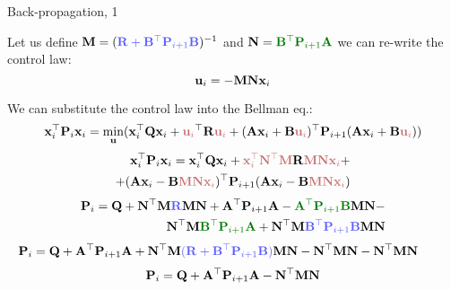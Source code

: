 \documentclass{beamer}
\begin{document}
\begin{frame}{Back-propagation, 1}
	\begin{flushleft}
		
		Let us define $\bo{M} = (\textcolor{myblue}{\bo{R} + \bo{B}\T \bo{P}_{i+1} \bo{B}})^{-1}$ and $\bo{N} =\textcolor{mydarkgreen}{\bo{B}\T \bo{P}_{i+1} \bo{A}}$ we can re-write the control law:
		\begin{equation}
			\mathbf{u}_i = -\mathbf{M} \mathbf{N} \mathbf{x}_i
		\end{equation}
		
		We can substitute the control law into the Bellman eq.:
		\begin{equation*}
			\bo{x}_i\T \bo{P}_i \bo{x}_i
			= \underset{\bo{u}}{\text{min}} 
			(\bo{x}_i\T \bo{Q} \bo{x}_i +  \textcolor{myred}{\bo{u}_i}\T \bo{R} \textcolor{myred}{\bo{u}_i}  + 
			(\bo{A}\bo{x}_i + \bo{B}\textcolor{myred}{\bo{u}_i})\T \bo{P}_{i+1} (\bo{A}\bo{x}_i + \bo{B}\textcolor{myred}{\bo{u}_i}) 
			)
		\end{equation*}
		\begin{align*}
		\bo{x}_i\T \bo{P}_i \bo{x}_i
		= 
		\bo{x}_i\T \bo{Q} \bo{x}_i +  \textcolor{myred}{\bo{x}_i\T \bo{N}\T \bo{M}} \bo{R} \textcolor{myred}{\bo{M} \bo{N} \bo{x}_i}  + 
		\\
		+
		(\bo{A}\bo{x}_i - \bo{B}\textcolor{myred}{\bo{M} \bo{N} \bo{x}_i})\T \bo{P}_{i+1} (\bo{A}\bo{x}_i - \bo{B}\textcolor{myred}{\bo{M} \bo{N} \bo{x}_i}) 
		\end{align*}
		\begin{align*}
		\bo{P}_i 
		= 
		\bo{Q} +  \bo{N}\T \bo{M}\textcolor{myblue}{ \bo{R}} \bo{M} \bo{N} + \bo{A}\T \bo{P}_{i+1} \bo{A} - 
		\textcolor{mydarkgreen}{\bo{A}\T \bo{P}_{i+1} \bo{B}} \bo{M} \bo{N} - \\
		 \bo{N}\T  \bo{M} \textcolor{mydarkgreen}{\bo{B}\T  \bo{P}_{i+1} \bo{A}}  +
		 \bo{N}\T  \bo{M}\textcolor{myblue}{ \bo{B}\T  \bo{P}_{i+1} \bo{B}} \bo{M} \bo{N} 
		\end{align*}
		\begin{align*}\hspace*{-0.8cm} %
		\bo{P}_i 
		= 
		\bo{Q}  + \bo{A}\T \bo{P}_{i+1} \bo{A}  +  \bo{N}\T \bo{M}\textcolor{myblue}{ (\bo{R} + \bo{B}\T  \bo{P}_{i+1} \bo{B})} \bo{M} \bo{N}
		-\bo{N}\T \bo{M} \bo{N} 
		-\bo{N}\T  \bo{M} \bo{N}  
		\end{align*}
		\begin{align*}
		\mathbf{P}_i = 	\mathbf{Q} + \mathbf{A}^\top \mathbf{P}_{i+1} \mathbf{A} - \mathbf{N}^\top  \mathbf{M} \mathbf{N}  
		\end{align*}
		
		
		
	\end{flushleft}
\end{frame}
\end{document}
